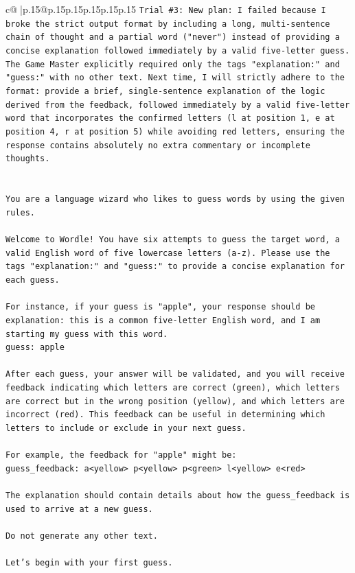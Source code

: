 \documentclass{article}
\begin{document}
{\begin{supertabular}{c@{$\;$}|p{.15\linewidth}@{}p{.15\linewidth}p{.15\linewidth}p{.15\linewidth}p{.15\linewidth}p{.15\linewidth}}
{{{\texttt{Trial \#3: New plan: I failed because I broke the strict output format by including a long, multi{-}sentence chain of thought and a partial word ("never") instead of providing a concise explanation followed immediately by a valid five{-}letter guess. The Game Master explicitly required only the tags "explanation:" and "guess:" with no other text. Next time, I will strictly adhere to the format: provide a brief, single{-}sentence explanation of the logic derived from the feedback, followed immediately by a valid five{-}letter word that incorporates the confirmed letters (l at position 1, e at position 4, r at position 5) while avoiding red letters, ensuring the response contains absolutely no extra commentary or incomplete thoughts.} \\
\\ 
\\ 
\texttt{You are a language wizard who likes to guess words by using the given rules.} \\
\\ 
\texttt{Welcome to Wordle! You have six attempts to guess the target word, a valid English word of five lowercase letters (a{-}z). Please use the tags "explanation:" and "guess:" to provide a concise explanation for each guess.} \\
\\ 
\texttt{For instance, if your guess is "apple", your response should be} \\
\texttt{explanation: this is a common five{-}letter English word, and I am starting my guess with this word.} \\
\texttt{guess: apple} \\
\\ 
\texttt{After each guess, your answer will be validated, and you will receive feedback indicating which letters are correct (green), which letters are correct but in the wrong position (yellow), and which letters are incorrect (red). This feedback can be useful in determining which letters to include or exclude in your next guess.} \\
\\ 
\texttt{For example, the feedback for "apple" might be:} \\
\texttt{guess\_feedback: a<yellow> p<yellow> p<green> l<yellow> e<red>} \\
\\ 
\texttt{The explanation should contain details about how the guess\_feedback is used to arrive at a new guess.} \\
\\ 
\texttt{Do not generate any other text.} \\
\\ 
\texttt{Let's begin with your first guess.} \\
            }
        }
    }
     \\ \\


\end{supertabular}}
\end{document}
